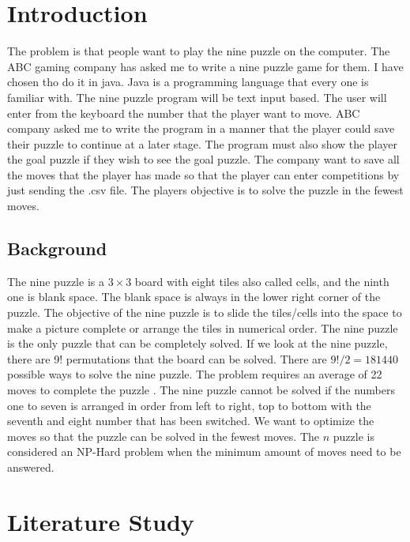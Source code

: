 \documentclass[10pt]{article}
\begin{document}

\tableofcontents
\pagebreak
\section{Introduction}
The problem is that people want to play the nine puzzle on the computer.  The ABC gaming company has asked me to write a nine puzzle game for them.  I have chosen tho do it in java.  Java is a programming language that every one is familiar with.  The nine puzzle program will be text input based.  The user will enter from the keyboard the number that the player want to move.  ABC company asked me to write the program in a manner that the player could save their puzzle to continue at a later stage.  The program must also show the player the goal puzzle if they wish to see the goal puzzle.  The company want to save all the moves that the player has made so that the player can enter competitions by just sending the .csv file.  The players objective is to solve the puzzle in the fewest moves. 
\subsection{Background}
The nine puzzle is a $3 \times 3$ board with eight tiles also called cells, and the ninth one is blank space. The blank space is always in the lower right corner of the puzzle. The objective of the nine puzzle is to slide the tiles/cells into the space to make a picture complete or arrange the tiles in numerical order. The nine puzzle is the only puzzle that can be completely solved. If we look at the nine puzzle, there are 9! permutations that the board can be solved\cite{reinefeld1993complete}. There are $9!/2 = 181 440$ possible ways to solve the nine puzzle. The problem requires an average of 22 moves to complete the puzzle \cite{reinefeld1993complete}.  The nine puzzle cannot be solved if the numbers one to seven is arranged in order from left to right, top to bottom with the seventh and eight number that has been switched. 
We want to optimize the moves so that the puzzle can be solved in the fewest moves. The $n$ puzzle is considered an NP-Hard problem when the minimum amount of moves need to be answered.
\section{Literature Study}
\end{document}
